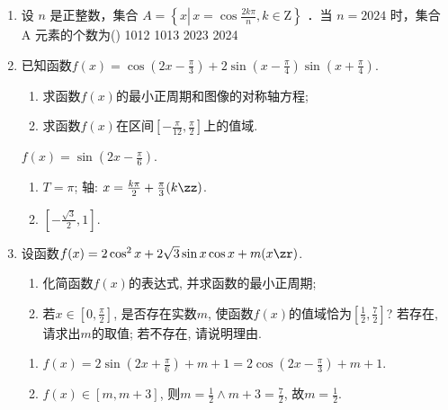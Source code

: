\begin{enumerate}
\item 设 $n$ 是正整数，集合 $A=\left\{x \left\lvert\, x=\cos \frac{2 k \pi}{n}\right., k \in \mathrm{Z}\right\}$ ．当 $n=2024$ 时，集合 A 元素的个数为\dotfill()
\xx
{1012}
{1013}
{2023}
{2024}

\item 已知函数$f(x)=\cos(2x-\frac{\pi}{3})+2\sin(x-\frac{\pi}{4})\sin(x+\frac{\pi}{4})$. 
\begin{enumerate}[(1)]
\item 求函数$f(x)$的最小正周期和图像的对称轴方程; 
\item 求函数$f(x)$在区间$[-\frac{\pi}{12},\frac{\pi}{2}]$上的值域. 
\end{enumerate}
\begin{jieda}
$f(x)=\sin(2x-\frac{\pi}{6})$. 
\begin{enumerate}
\item $T=\pi$; 轴: $x=\frac{k\pi}{2}+\frac{\pi}{3}(k\zz)$. 
\item $[-\frac{\sqrt{3}}{2},1]$. 
\end{enumerate}
\end{jieda}


\item 设函数$f(x)=2\cos^2x+2\sqrt{3}\sin{x}\cos{x}+m(x\zr)$. 
\begin{enumerate}[(1)]
\item 化简函数$f(x)$的表达式, 并求函数的最小正周期;
\item 若$x\in[0,\frac{\pi}{2}]$, 是否存在实数$m$, 使函数$f(x)$的值域恰为$[\frac{1}{2},\frac{7}{2}]$? 若存在, 请求出$m$的取值; 若不存在, 请说明理由. 
\end{enumerate}
\begin{jieda}
\begin{enumerate}[(1)]
\item $f(x)=2\sin(2x+\frac{\pi}{6})+m+1=2\cos(2x-\frac{\pi}{3})+m+1$. 
\item $f(x)\in[m,m+3]$, 则$m=\frac{1}{2}\land m+3=\frac{7}{2}$, 故$m=\frac{1}{2}$.  
\end{enumerate}
\end{jieda}



\end{enumerate}
